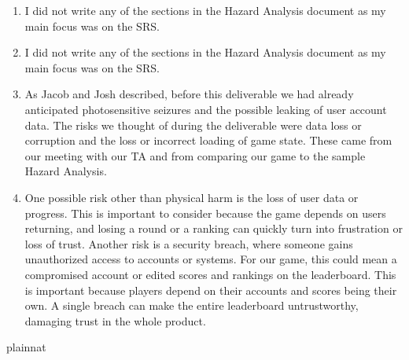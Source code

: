 \documentclass{article}
\begin{document}
\begin{enumerate}
    \item I did not write any of the sections in the Hazard Analysis document as my main focus was on the SRS.
    \item I did not write any of the sections in the Hazard Analysis document as my main focus was on the SRS.
    \item As Jacob and Josh described, before this deliverable we had already anticipated photosensitive seizures and the possible leaking of user account data. The risks we thought of during the deliverable were data loss or corruption and the loss or incorrect loading of game state. These came from our meeting with our TA and from comparing our game to the sample Hazard Analysis.
    \item One possible risk other than physical harm is the loss of user data or progress. This is important to consider because the game depends on users returning, and losing a round or a ranking can quickly turn into frustration or loss of trust. Another risk is a security breach, where someone gains unauthorized access to accounts or systems. For our game, this could mean a compromised account or edited scores and rankings on the leaderboard. This is important because players depend on their accounts and scores being their own. A single breach can make the entire leaderboard untrustworthy, damaging trust in the whole product.
\end{enumerate}

 {plainnat}

\end{document}
